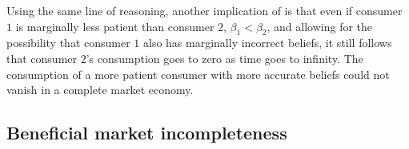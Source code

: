 Using  the same line of reasoning, another implication of 
is that even if consumer $1$ is marginally less patient than consumer $2$,
$\beta_1 < \beta_2$, and allowing for the possibility that
consumer $1$ also has marginally incorrect beliefs, it still follows
that consumer $2$'s consumption goes to zero as time goes
to infinity. The consumption of a more patient consumer with more accurate
beliefs could not vanish
 in a complete market economy.





\subsection{Beneficial market incompleteness}

